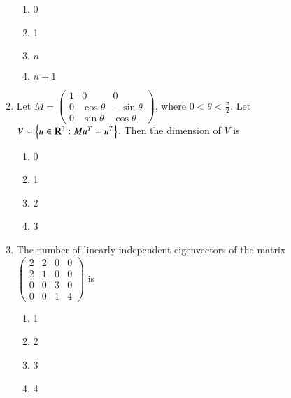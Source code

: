 \documentclass[journal]{IEEEtran}
\numberwithin{equation}{enumi}
\numberwithin{figure}{enumi}
\begin{document}
\begin{enumerate}[start=18]
\begin{enumerate}
    \item 0
    \item 1
    \item $n$
    \item $n+1$
\end{enumerate}
\item Let $M = \begin{pmatrix}
1 & 0 & 0 \\
0 & \cos \theta & -\sin \theta \\
0 & \sin \theta & \cos \theta
\end{pmatrix}$, where $0 < \theta < \frac{\pi}{2}$. Let $V = \left\{ u \in \mathbf{R}^3 : M u^T = u^T \right\}$. Then the dimension of $V$ is

\begin{enumerate}
    \item 0
    \item 1
    \item 2
    \item 3
\end{enumerate}
\item The number of linearly independent eigenvectors of the matrix
$
\begin{pmatrix}
2 & 2 & 0 & 0 \\
2 & 1 & 0 & 0 \\
0 & 0 & 3 & 0 \\
0 & 0 & 1 & 4
\end{pmatrix}
$
is
\begin{enumerate}
    \item 1
    \item 2
    \item 3
    \item 4
\end{enumerate}


\end{enumerate}
\end{document}
